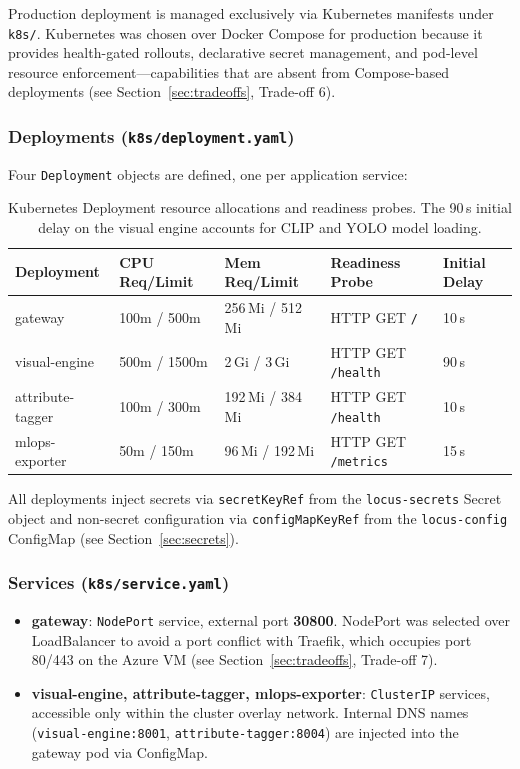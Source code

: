 \documentclass[12pt]{article}
\begin{document}
Production deployment is managed exclusively via Kubernetes manifests under \texttt{k8s/}. Kubernetes was chosen over Docker Compose for production because it provides health-gated rollouts, declarative secret management, and pod-level resource enforcement---capabilities that are absent from Compose-based deployments (see Section~\ref{sec:tradeoffs}, Trade-off 6).

\subsubsection{Deployments (\texttt{k8s/deployment.yaml})}

Four \texttt{Deployment} objects are defined, one per application service:

\begin{table}[H]
\centering
\small
\begin{tabular}{@{}lllll@{}}
\toprule
\textbf{Deployment} & \textbf{CPU Req/Limit} & \textbf{Mem Req/Limit} & \textbf{Readiness Probe} & \textbf{Initial Delay} \\ \midrule
gateway             & 100m / 500m   & 256\,Mi / 512\,Mi & HTTP GET \texttt{/}        & 10\,s \\
visual-engine       & 500m / 1500m  & 2\,Gi / 3\,Gi     & HTTP GET \texttt{/health}  & 90\,s \\
attribute-tagger    & 100m / 300m   & 192\,Mi / 384\,Mi & HTTP GET \texttt{/health}  & 10\,s \\
mlops-exporter      & 50m / 150m    & 96\,Mi / 192\,Mi  & HTTP GET \texttt{/metrics} & 15\,s \\ \bottomrule
\end{tabular}
\caption{Kubernetes Deployment resource allocations and readiness probes. The 90\,s initial delay on the visual engine accounts for CLIP and YOLO model loading.}
\label{tab:k8s-resources}
\end{table}

All deployments inject secrets via \texttt{secretKeyRef} from the \texttt{locus-secrets} Secret object and non-secret configuration via \texttt{configMapKeyRef} from the \texttt{locus-config} ConfigMap (see Section~\ref{sec:secrets}).

\subsubsection{Services (\texttt{k8s/service.yaml})}

\begin{itemize}[leftmargin=*]
  \item \textbf{gateway}: \texttt{NodePort} service, external port \textbf{30800}. NodePort was selected over LoadBalancer to avoid a port conflict with Traefik, which occupies port 80/443 on the Azure VM (see Section~\ref{sec:tradeoffs}, Trade-off 7).
  \item \textbf{visual-engine, attribute-tagger, mlops-exporter}: \texttt{ClusterIP} services, accessible only within the cluster overlay network. Internal DNS names (\texttt{visual-engine:8001}, \texttt{attribute-tagger:8004}) are injected into the gateway pod via ConfigMap.
\end{itemize}
\end{document}
